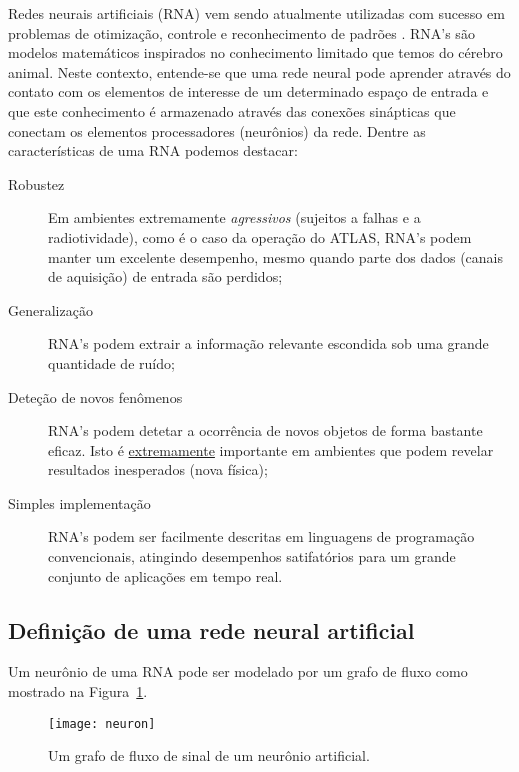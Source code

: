 Redes neurais artificiais (RNA) vem sendo atualmente utilizadas com sucesso em
problemas de otimização, controle e reconhecimento de padrões
\cite{haykin}. RNA's são modelos matemáticos inspirados no
conhecimento limitado que temos do cérebro animal. Neste contexto, entende-se
que uma rede neural pode aprender através do contato com os elementos de
interesse de um determinado espaço de entrada e que este conhecimento é
armazenado através das conexões sinápticas que conectam os elementos
processadores (neurônios) da rede. Dentre as características de uma RNA
podemos destacar:

\begin{description}
\item[Robustez] Em ambientes extremamente \emph{agressivos} (sujeitos a falhas
e a radiotividade), como é o caso da operação do ATLAS, RNA's podem manter um
excelente desempenho, mesmo quando parte dos dados (canais de aquisição) de
entrada são perdidos;

\item[Generalização] RNA's podem extrair a informação relevante escondida sob
uma grande quantidade de ruído;

\item[Deteção de novos fenômenos] RNA's podem detetar a ocorrência de novos
objetos de forma bastante eficaz. Isto é \underline{extremamente} importante
em ambientes que podem revelar resultados inesperados (nova física);

\item[Simples implementação] RNA's podem ser facilmente descritas em
linguagens de programação convencionais, atingindo desempenhos satifatórios
para um grande conjunto de aplicações em tempo real.
\end{description}

\subsection{Definição de uma rede neural artificial}

Um neurônio de uma RNA pode ser modelado por um grafo de fluxo como mostrado
na Figura~\ref{fig:neuron}.

\begin{figure}
\begin{center}
\texttt{[image: neuron]}
\end{center}
\caption{Um grafo de fluxo de sinal de um neurônio artificial.}
\label{fig:neuron}
\end{figure}

